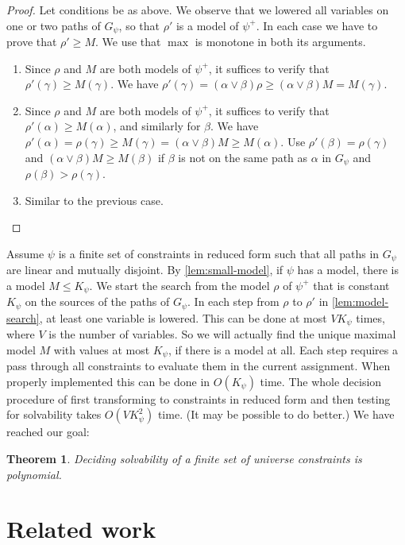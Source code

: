 \documentclass[11pt,a4paper]{article}
\newtheorem{theorem}{Theorem}[section]
\begin{document}
\begin{proof}
Let conditions be as above. We observe that we lowered all variables on one or two
paths of $G_ \psi$, so that $\rho'$ is a model of $ \psi^+$. In each case we
have to prove that $\rho'\geq M$.
We use that $\max$ is monotone in both its arguments.
\begin{enumerate}
\item Since $\rho$ and $M$ are both models of $ \psi^+$, it suffices to 
verify that $\rho'(\gamma)\geq M(\gamma)$. We have 
$\rho'(\gamma)= (\alpha\vee\beta)\rho \geq (\alpha\vee\beta)M = M(\gamma)$.
\item Since $\rho$ and $M$ are both models of $ \psi^+$, it suffices to 
verify that $\rho'(\alpha)\geq M(\alpha)$, and similarly for $\beta$. We have
$\rho'(\alpha)= \rho(\gamma)\geq M(\gamma) = (\alpha\vee\beta)M \geq M(\alpha)$.
Use $\rho'(\beta) = \rho(\gamma)$ and $(\alpha\vee\beta)M \geq M(\beta)$
if $\beta$ is not on the same path as $\alpha$ in $G_ \psi$ and $\rho(\beta)>\rho(\gamma)$. 
\item Similar to the previous case.
\end{enumerate}
\end{proof}

Assume  $\psi$ is a finite set of constraints in reduced form such that all paths 
in $G_ \psi$ are linear and mutually disjoint. By \cref{lem:small-model},
if  $\psi$ has a model, there is a model $M \leq K_ \psi$.
We start the search from the model $\rho$ of $ \psi^+$ that is constant $K_ \psi$
on the sources of the paths of $G_ \psi$.
In each step from $\rho$ to $\rho'$ in \cref{lem:model-search},
at least one variable is lowered. This can be done at most $V K_ \psi$ times,
where $V$ is the number of variables. So we will actually find the unique maximal
model $M$ with values at most $K_ \psi$, if there is a model at all.
Each step requires a pass through all constraints to evaluate them in the current assignment.
When properly implemented this can be done in $O(K_ \psi)$ time.
The whole decision procedure of first transforming to constraints in reduced
form and then testing for solvability takes $O(V K^2_ \psi)$ time.
(It may be possible to do better.) We have reached our goal:

\begin{theorem}\label{thm:P-solvability}
Deciding solvability of a finite set of universe constraints is polynomial.
\end{theorem}


\section{Related work}
\end{document}
